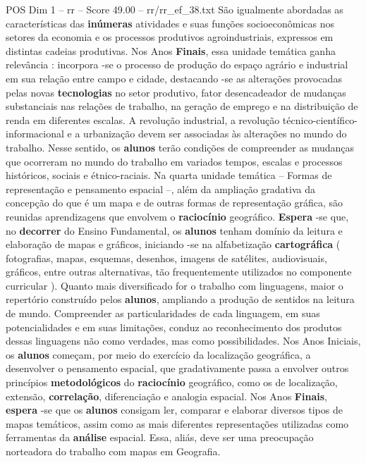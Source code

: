 \begin{textsample}{POS Dim 1 – rr – Score 49.00 – rr/rr\_ef\_38.txt}
São igualmente abordadas as características das \textbf{inúmeras} atividades e suas funções socioeconômicas nos setores da economia e os processos produtivos agroindustriais, expressos em distintas cadeias produtivas.
Nos Anos \textbf{Finais}, essa unidade temática ganha relevância : incorpora -se o processo de produção do espaço agrário e industrial em sua relação entre campo e cidade, destacando -se as alterações provocadas pelas novas \textbf{tecnologias} no setor produtivo, fator desencadeador de mudanças substanciais nas relações de trabalho, na geração de emprego e na distribuição de renda em diferentes escalas.
A revolução industrial, a revolução técnico-científico-informacional e a urbanização devem ser associadas às alterações no mundo do trabalho.
Nesse sentido, os \textbf{alunos} terão condições de compreender as mudanças que ocorreram no mundo do trabalho em variados tempos, escalas e processos históricos, sociais e étnico-raciais.
Na quarta unidade temática – Formas de representação e pensamento espacial –, além da ampliação gradativa da concepção do que é um mapa e de outras formas de representação gráfica, são reunidas aprendizagens que envolvem o \textbf{raciocínio} geográfico. \textbf{Espera} -se que, no \textbf{decorrer} do Ensino Fundamental, os \textbf{alunos} tenham domínio da leitura e elaboração de mapas e gráficos, iniciando -se na alfabetização \textbf{cartográfica} ( fotografias, mapas, esquemas, desenhos, imagens de satélites, audiovisuais, gráficos, entre outras alternativas, tão frequentemente utilizados no componente curricular ).
Quanto mais diversificado for o trabalho com linguagens, maior o repertório construído pelos \textbf{alunos}, ampliando a produção de sentidos na leitura de mundo.
Compreender as particularidades de cada linguagem, em suas potencialidades e em suas limitações, conduz ao reconhecimento dos produtos dessas linguagens não como verdades, mas como possibilidades.
Nos Anos Iniciais, os \textbf{alunos} começam, por meio do exercício da localização geográfica, a desenvolver o pensamento espacial, que gradativamente passa a envolver outros princípios \textbf{metodológicos} do \textbf{raciocínio} geográfico, como os de localização, extensão, \textbf{correlação}, diferenciação e analogia espacial.
Nos Anos \textbf{Finais}, \textbf{espera} -se que os \textbf{alunos} consigam ler, comparar e elaborar diversos tipos de mapas temáticos, assim como as mais diferentes representações utilizadas como ferramentas da \textbf{análise} espacial.
Essa, aliás, deve ser uma preocupação norteadora do trabalho com mapas em Geografia.

\end{textsample}
